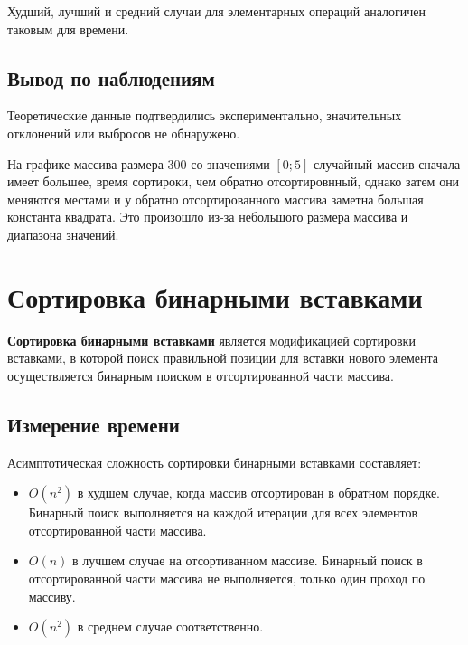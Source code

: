 \documentclass[11pt]{article}
\begin{document}
Худший, лучший и средний случаи для элементарных операций аналогичен таковым для времени.

\subsection{Вывод по наблюдениям}

Теоретические данные подтвердились экспериментально, значительных отклонений или выбросов не обнаружено.

На графике массива размера 300 со значениями $\left[0;5\right]$ случайный массив
сначала имеет большее, время сортироки, чем обратно отсортировнный, однако затем они меняются местами и у
обратно отсортированного массива заметна большая константа квадрата. Это произошло из-за небольшого размера массива
и диапазона значений.

\newpage

\setcounter{section}{6}
\section*{\centering Сортировка бинарными вставками}

\textbf{Сортировка бинарными вставками} является модификацией сортировки вставками, в
которой поиск правильной позиции для вставки нового элемента осуществляется бинарным поиском в отсортированной части массива.

\setcounter{subsection}{0}
\subsection{Измерение времени}

\begin{center}
\end{center}
{ \hspace*{\fill} }

\begin{center}
\end{center}
{ \hspace*{\fill} }

Асимптотическая сложность сортировки бинарными вставками составляет:
\begin{itemize}
    \item $O(n^2)$ в худшем случае, когда массив отсортирован в обратном порядке. Бинарный поиск выполняется на каждой
          итерации для всех элементов отсортированной части массива.
    \item $O(n)$ в лучшем случае на отсортиванном массиве. Бинарный поиск в отсортированной части массива не выполняется, только один проход по массиву.
    \item $O(n^2)$ в среднем случае соответственно.
\end{itemize}
\end{document}
